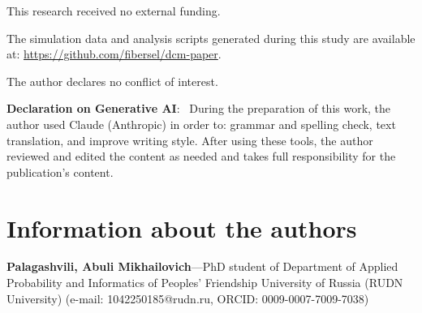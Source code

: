 \documentclass[default]{subfiles}
\begin{document}
{\begin{funding}
This research received no external funding.
\end{funding}

\begin{dataavailability}
The simulation data and analysis scripts generated during this study are available at: \url{https://github.com/fibersel/dcm-paper}.
\end{dataavailability}

\begin{conflictsofinterest}
The author declares no conflict of interest.
\end{conflictsofinterest}

\noindent\footnotesize{\textbf{Declaration on Generative AI}:~}
During the preparation of this work, the author used Claude (Anthropic) in order to: grammar and spelling check, text translation, and improve writing style. After using these tools, the author reviewed and edited the content as needed and takes full responsibility for the publication's content.
\normalsize

\printbibliography

\section*{Information about the authors}

\noindent\textbf{Palagashvili, Abuli Mikhailovich}---PhD student of Department of Applied Probability and Informatics of Peoples' Friendship University of Russia (RUDN University) (e-mail: 1042250185@rudn.ru, ORCID: 0009-0007-7009-7038)

}%
\end{document}
